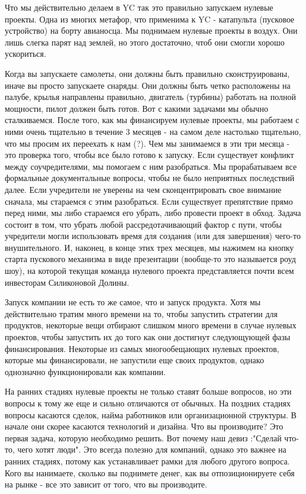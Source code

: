 \documentclass[ebook,12pt,oneside,openany]{memoir}
\begin{document}
Что мы действительно делаем в YC так это правильно запускаем нулевые
проекты. Одна из многих метафор, что применима к YC - катапульта
(пусковое устройство) на борту авианосца. Мы поднимаем нулевые проекты
в воздух. Они лишь слегка парят над землей, но этого достаточно, чтоб
они смогли хорошо ускориться.

Когда вы запускаете самолеты, они должны быть правильно
сконструированы, иначе вы просто запускаете снаряды. Они должны быть
четко расположены на палубе, крылья направлены правильно, двигатель
(турбины) работать на полной мощности, пилот должен быть готов. Вот с
какими задачами мы обычно сталкиваемся. После того, как мы финансируем
нулевые проекты, мы работаем с ними очень тщательно в течение 3
месяцев - на самом деле настолько тщательно, что мы просим их
переехать к нам (?). Чем мы занимаемся в эти три месяца - это проверка
того, чтобы все было готово к запуску. Если существует конфликт между
соучредителями, мы помогаем с ним разобраться. Мы прорабатываем все
формальные документальные вопросы, чтобы не было неприятных
последствий далее. Если учредители не уверены на чем сконцентрировать
свое внимание сначала, мы стараемся с этим разобраться. Если
существует препятствие прямо перед ними, мы либо стараемся его убрать,
либо провести проект в обход. Задача состоит в том, что убрать любой
рассредотачивающий фактор с пути, чтобы учредители могли использовать
время для создания (или для завершения) чего-то внушительного. И,
наконец, в конце этих трех месяцев, мы нажимем на кнопку старта
пускового механизма в виде презентации (вообще-то это называется роуд
шоу), на которой текущая команда нулевого проекта представляется почти
всем инвесторам Силиконовой Долины.

Запуск компании не есть то же самое, что и запуск продукта. Хотя мы
действительно тратим много времени на то, чтобы запустить стратегии
для продуктов, некоторые вещи отбирают слишком много времени в случае
нулевых проектов, чтобы запустить их до того как они достигнут
следующующей фазы финансирования. Некоторые из самых многообещающих
нулевых проектов, которые мы финансировали, не запустили еще своих
продуктов, однако однозначно функционировали как компании.

На ранних стадиях нулевые проекты не только ставят больше вопросов, но
эти вопросы к тому же еще и сильно отличаются от обычных. На поздних
стадиях вопросы касаются сделок, найма работников или организационной
структуры. В начале они скорее касаются технологий и дизайна. Что вы
производите? Это первая задача, которую необходимо решить. Вот почему
наш девиз :"Сделай что-то, чего хотят люди". Это всегда полезно для
компаний, однако это важнее на ранних стадиях, потому как
устанавливает рамки для любого другого вопроса. Кого вы нанимаете,
сколько вы поднимете денег, как вы отпозиционируете себя на рынке -
все это зависит от того, что вы производите.
\end{document}
